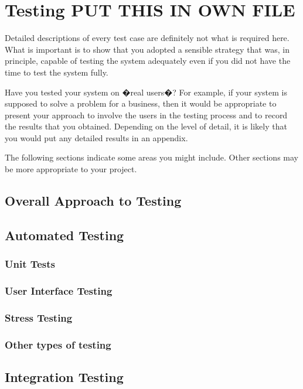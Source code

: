 \chapter{Testing PUT THIS IN OWN FILE}

Detailed descriptions of every test case are definitely not what is required here. What is important is to show that you adopted a sensible strategy that was, in principle, capable of testing the system adequately even if you did not have the time to test the system fully.

Have you tested your system on �real users�? For example, if your system is supposed to solve a problem for a business, then it would be appropriate to present your approach to involve the users in the testing process and to record the results that you obtained. Depending on the level of detail, it is likely that you would put any detailed results in an appendix.

The following sections indicate some areas you might include. Other sections may be more appropriate to your project. 

\section{Overall Approach to Testing}

\section{Automated Testing}

\subsection{Unit Tests}

\subsection{User Interface Testing}

\subsection{Stress Testing}

\subsection{Other types of testing}

\section{Integration Testing}

